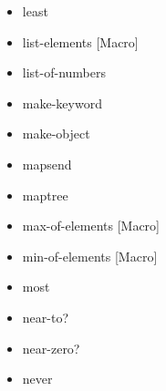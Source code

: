 \documentclass [11pt]{book}
\begin{document}
\begin{itemize}
\item {}least





\item {}list-elements [Macro]





\item {}list-of-numbers





\item {}make-keyword





\item {}make-object





\item {}mapsend





\item {}maptree





\item {}max-of-elements [Macro]





\item {}min-of-elements [Macro]





\item {}most





\item {}near-to?





\item {}near-zero?





\item {}never






\end{itemize}
\end{document}
